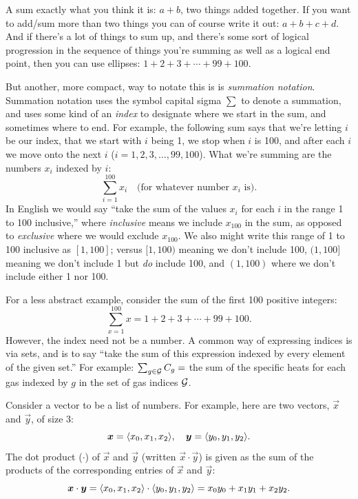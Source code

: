 \documentclass{article}
\begin{document}
\begin{note*}

    A sum exactly what you think it is: $a+b$, two things added together.
    If you want to add/sum more than two things you can of course write it out:
    $a + b + c + d$.
    And if there's a lot of things to sum up, and there's some sort of logical
    progression in the sequence of things you're summing as well as a logical end point,
    then you can use ellipses:
    $1 + 2 + 3 + \cdots + 99 + 100$.

    But another, more compact, way to notate this is is \emph{summation notation}.
    Summation notation uses the symbol capital sigma $\sum$ to denote a summation,
    and uses some kind of an \emph{index} to designate where we start in the sum, and
    sometimes where to end.
    For example, the following sum says that we're letting $i$ be our index, that we start with
    $i$ being 1, we stop when $i$ is 100, and after each $i$ we move onto the next $i$
    ($i=1,2,3,\ldots,99,100$). What we're summing are the numbers $x_i$ indexed by $i$:
    \[
        \sum_{i=1}^{100} x_i \quad \text{(for whatever number $x_i$ is)}.
    \]
    In English we would say ``take the sum of the values $x_i$ for each $i$ in the range
    1 to 100 inclusive,'' where \emph{inclusive} means we include $x_{100}$ in the sum, as
    opposed to \emph{exclusive} where we would exclude $x_{100}$. We also might write this range
    of 1 to 100 inclusive as $[1,100]$; versus $[1,100)$ meaning we don't include 100, $(1,100]$
    meaning we don't include 1 but \emph{do} include 100, and $(1,100)$ where we don't include
    either 1 nor 100.

    For a less abstract example, consider the sum of the first 100 positive integers:
    \[
        \sum_{x=1}^{100} x
        = 1 + 2 + 3 + \cdots + 99 + 100.
    \]
    However, the index need not be a number. A common way of expressing indices is via sets, and is
    to say ``take the sum of this expression indexed by every element of the given set.''
    For example: $\sum_{g\in\operatorname{{\mathcal{G}}}}C_g = $ the sum of the specific heats for each gas indexed by $g$
    in the set of gas indices $\operatorname{{\mathcal{G}}}$.
\end{note*}
\begin{note*}

    Consider a vector to be a list of numbers.
    For example, here are two vectors, $\vec x$ and $\vec y$, of size 3:
    \[
        \boldsymbol{x} = {\langle{x_0,x_1,x_2}\rangle}, \quad
        \boldsymbol{y} = {\langle{y_0,y_1,y_2}\rangle}.
    \]
    The dot product ($\cdot$) of $\vec x$ and $\vec y$ (written $\vec x\cdot\vec y$) is given
    as the sum of the products of the corresponding entries of $\vec x$ and $\vec y$:
    \[
        \boldsymbol{x}\cdot\boldsymbol{y}
        = {\langle{x_0,x_1,x_2}\rangle}\cdot{\langle{y_0,y_1,y_2}\rangle}
        = x_0 y_0+x_1 y_1+x_2 y_2.
    \]
\end{note*}
\end{document}
